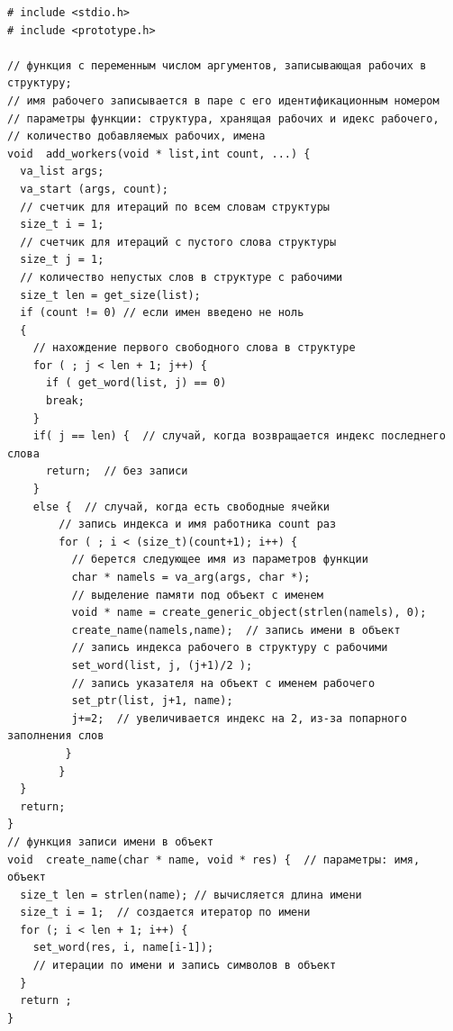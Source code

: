 \documentclass[12pt,a4paper]{article}
\begin{document}
\begin{lstlisting}
# include <stdio.h>
# include <prototype.h>

// функция с переменным числом аргументов, записывающая рабочих в структуру;
// имя рабочего записывается в паре с его идентификационным номером
// параметры функции: структура, хранящая рабочих и идекс рабочего, 
// количество добавляемых рабочих, имена
void  add_workers(void * list,int count, ...) { 
  va_list args;                                 
  va_start (args, count);
  // счетчик для итераций по всем словам структуры
  size_t i = 1;
  // счетчик для итераций с пустого слова структуры
  size_t j = 1;
  // количество непустых слов в структуре с рабочими 
  size_t len = get_size(list);
  if (count != 0) // если имен введено не ноль
  {
    // нахождение первого свободного слова в структуре
    for ( ; j < len + 1; j++) {  
      if ( get_word(list, j) == 0)  
      break;
    }
    if( j == len) {  // случай, когда возвращается индекс последнего слова
      return;  // без записи
    }
    else {  // случай, когда есть свободные ячейки
        // запись индекса и имя работника count раз
        for ( ; i < (size_t)(count+1); i++) {
          // берется следующее имя из параметров функции
          char * namels = va_arg(args, char *);
          // выделение памяти под объект с именем
          void * name = create_generic_object(strlen(namels), 0);  
          create_name(namels,name);  // запись имени в объект
          // запись индекса рабочего в структуру с рабочими
          set_word(list, j, (j+1)/2 );
          // запись указателя на объект с именем рабочего
          set_ptr(list, j+1, name);  
          j+=2;  // увеличивается индекс на 2, из-за попарного заполнения слов
         }
        }
  }
  return;
}
// функция записи имени в объект
void  create_name(char * name, void * res) {  // параметры: имя, объект
  size_t len = strlen(name); // вычисляется длина имени
  size_t i = 1;  // создается итератор по имени
  for (; i < len + 1; i++) {
    set_word(res, i, name[i-1]);  
    // итерации по имени и запись символов в объект
  }
  return ;
}


\end{lstlisting}
\end{document}
